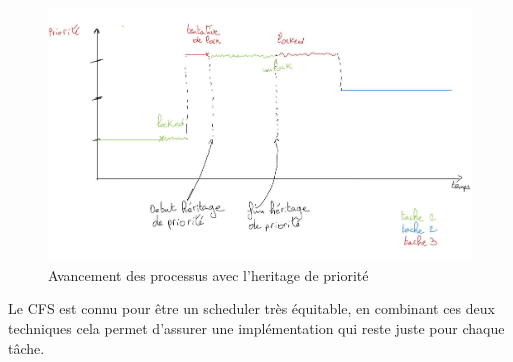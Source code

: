 \begin{figure}[h!]
	\centering
	\includegraphics[scale=0.21]{include/with_inherit.jpg}
	\caption{Avancement des processus avec l'heritage de priorité}
	\label{fig:with_inherit}
\end{figure}

Le CFS est connu pour être un scheduler très équitable, en combinant ces deux techniques cela permet d'assurer une implémentation qui reste juste pour chaque tâche.